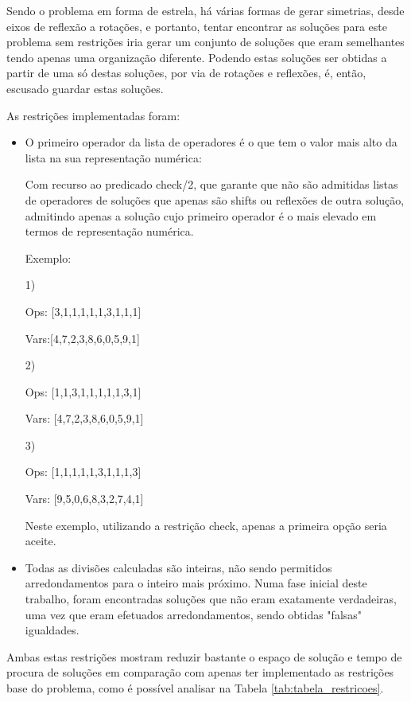 Sendo o problema em forma de estrela, há várias formas de gerar simetrias, desde eixos de reflexão a rotações, e portanto, tentar encontrar as soluções para este problema sem restrições iria gerar um conjunto de soluções que eram semelhantes tendo apenas uma organização diferente. Podendo estas soluções ser obtidas a partir de uma só destas soluções, por via de rotações e reflexões, é, então, escusado guardar estas soluções.

As restrições implementadas foram:
\begin{itemize}
  \item O primeiro operador da lista de operadores é o que tem o valor mais alto da lista na sua representação numérica:
  
  Com recurso ao predicado check/2, que garante que não são admitidas listas de operadores de soluções que apenas são shifts ou reflexões de outra solução, admitindo apenas a solução cujo primeiro operador é o mais elevado em termos de representação numérica. 
  
  Exemplo:
  
  1)
  
  Ops: [3,1,1,1,1,1,3,1,1,1]
  
  Vars:[4,7,2,3,8,6,0,5,9,1]
  
  
  2)
  
  Ops: [1,1,3,1,1,1,1,1,3,1]  
  
  Vars: [4,7,2,3,8,6,0,5,9,1] 
  
  
  3)
  
  Ops: [1,1,1,1,1,3,1,1,1,3] 
  
  Vars: [9,5,0,6,8,3,2,7,4,1]
  
  Neste exemplo, utilizando a restrição check, apenas a primeira opção seria aceite.
  
  \item Todas as divisões calculadas são inteiras, não sendo permitidos arredondamentos para o inteiro mais próximo. Numa fase inicial deste trabalho, foram encontradas soluções que não eram exatamente verdadeiras, uma vez que eram efetuados arredondamentos, sendo obtidas "falsas" igualdades.
\end{itemize}

Ambas estas restrições mostram reduzir bastante o espaço de solução e tempo de procura de soluções em comparação com apenas ter implementado as restrições base do problema, como é possível analisar na Tabela \ref{tab:tabela_restricoes}.



